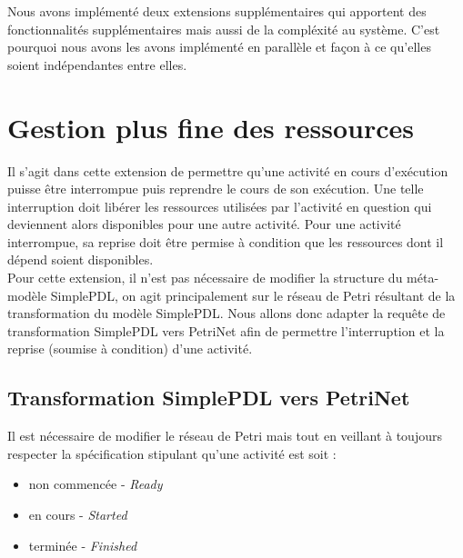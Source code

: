 Nous avons implémenté deux extensions supplémentaires qui apportent des fonctionnalités supplémentaires mais aussi de la compléxité au système. C'est pourquoi nous avons les avons implémenté en parallèle et façon à ce qu'elles soient indépendantes entre elles.

\section{Gestion plus fine des ressources}

Il s'agit dans cette extension de permettre qu'une activité en cours d'exécution puisse être interrompue puis reprendre le cours de son exécution. Une telle interruption doit libérer les ressources utilisées par l'activité en question qui deviennent alors disponibles pour une autre activité. Pour une activité interrompue, sa reprise doit être permise à condition que les ressources dont il dépend soient disponibles.\\
Pour cette extension, il n'est pas nécessaire de modifier la structure du méta-modèle SimplePDL, on agit principalement sur le réseau de Petri résultant de la transformation du modèle SimplePDL. Nous allons donc adapter la requête de transformation SimplePDL vers PetriNet afin de permettre l'interruption et la reprise (soumise à condition) d'une activité.

\subsection{Transformation SimplePDL vers PetriNet}

Il est nécessaire de modifier le réseau de Petri mais tout en veillant à toujours respecter la spécification stipulant qu'une activité est soit :
\begin{itemize}
\item non commencée - \textit{Ready}
\item en cours - \textit{Started}
\item terminée - \textit{Finished}\\
\end{itemize}

